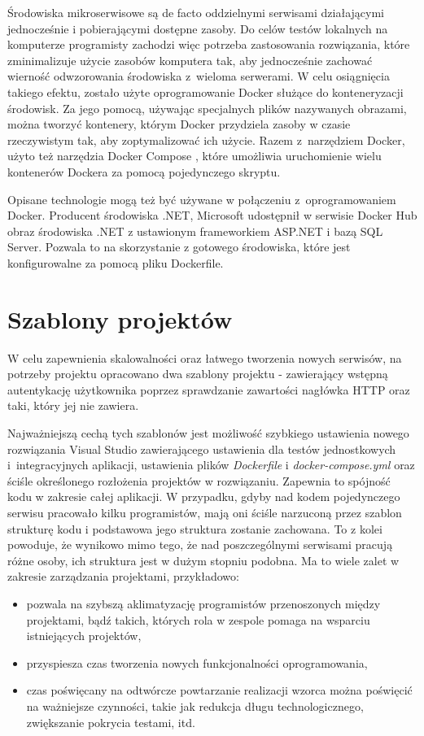 \documentclass{SGGW-thesis}
\begin{document}
Środowiska mikroserwisowe są de facto oddzielnymi serwisami działającymi jednocześnie i pobierającymi dostępne zasoby. Do celów testów lokalnych na komputerze programisty zachodzi więc potrzeba zastosowania rozwiązania, które zminimalizuje użycie zasobów komputera tak, aby jednocześnie zachować wierność odwzorowania środowiska z~wieloma serwerami. W celu osiągnięcia takiego efektu, zostało użyte oprogramowanie Docker służące do konteneryzacji środowisk. Za jego pomocą, używając specjalnych plików nazywanych obrazami, można tworzyć kontenery, którym Docker przydziela zasoby w czasie rzeczywistym tak, aby zoptymalizować ich użycie.
Razem z~narzędziem Docker, użyto też narzędzia Docker Compose \cite{dockercompose}, które umożliwia uruchomienie wielu kontenerów Dockera za pomocą pojedynczego skryptu.

Opisane technologie mogą też być używane w połączeniu z~oprogramowaniem Docker. Producent środowiska .NET, Microsoft udostępnił w serwisie Docker Hub obraz środowiska .NET z ustawionym frameworkiem ASP.NET i bazą SQL Server. Pozwala to na skorzystanie z gotowego środowiska, które jest konfigurowalne za pomocą pliku Dockerfile.



\section{Szablony projektów}
W celu zapewnienia skalowalności oraz łatwego tworzenia nowych serwisów, na potrzeby projektu opracowano dwa szablony projektu - zawierający wstępną autentykację użytkownika poprzez sprawdzanie zawartości nagłówka HTTP oraz taki, który jej nie zawiera.

Najważniejszą cechą tych szablonów jest możliwość szybkiego ustawienia nowego rozwiązania Visual Studio zawierającego ustawienia dla testów jednostkowych i~integracyjnych aplikacji, ustawienia plików \textit{Dockerfile} i \textit{docker-compose.yml} oraz ściśle określonego rozłożenia projektów w rozwiązaniu. Zapewnia to spójność kodu w zakresie całej aplikacji. W przypadku, gdyby nad kodem pojedynczego serwisu pracowało kilku programistów, mają oni ściśle narzuconą przez szablon strukturę kodu i podstawowa jego struktura zostanie zachowana. To z kolei powoduje, że wynikowo mimo tego, że nad poszczególnymi serwisami pracują różne osoby, ich struktura jest w dużym stopniu podobna. Ma to wiele zalet w zakresie zarządzania projektami, przykładowo:

\begin{itemize}
	\item pozwala na szybszą aklimatyzację programistów przenoszonych między projektami, bądź takich, których rola w zespole pomaga na wsparciu istniejących projektów,
	\item przyspiesza czas tworzenia nowych funkcjonalności oprogramowania,
	\item czas poświęcany na odtwórcze powtarzanie realizacji wzorca można poświęcić na ważniejsze czynności, takie jak redukcja długu technologicznego, zwiększanie pokrycia testami, itd.
\end{itemize}
\end{document}
